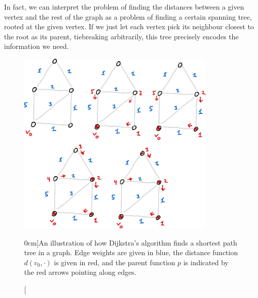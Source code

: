 \documentclass[nobib]{tufte-handout}
\begin{document}
In fact, we can interpret the problem of finding the distances between a given vertex and the rest of the graph as a problem of finding a certain spanning tree, rooted at the given vertex. If we just let each vertex pick its neighbour closest to the root as its parent, tiebreaking arbitrarily, this tree precisely encodes the information we need.

\begin{figure}
  \centering
  \includegraphics[width=0.85\textwidth]{graphics/L6_prim_kruskal_dijkstra/dijkstras_algorithm.png}
  \caption[][0cm]{An illustration of how Dijkstra's algorithm finds a shortest path tree in a graph. Edge weights are given in blue, the distance function $d(v_0, \cdot)$ is given in red, and the parent function $p$ is indicated by the red arrows pointing along edges.}
  \label{fig:dijkstras_algorithm}
\end{figure}
\end{document}
